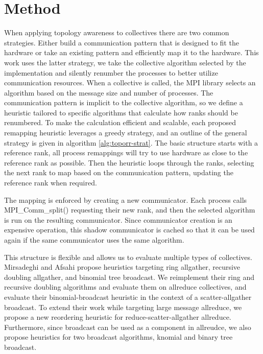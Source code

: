 \section{Method}
When applying topology awareness to collectives there are two common strategies.
Either build a communication pattern that is designed to fit the hardware or take an existing pattern and efficiently map it to the hardware.
This work uses the latter strategy, we take the collective algorithm selected by the implementation and silently renumber the processes to better utilize communication resources.
When a collective is called, the MPI library selects an algorithm based on the message size and number of processes.
The communication pattern is implicit to the collective algorithm, so we define a heuristic tailored to specific algorithms that calculate how ranks should be renumbered.
To make the calculation efficient and scalable, each proposed remapping heuristic leverages a greedy strategy, and an outline of the general strategy is given in algorithm \ref{alg:toporr-strat}.
The basic structure starts with a reference rank, all process remappings will try to use hardware as close to the reference rank as possible.
Then the heuristic loops through the ranks, selecting the next rank to map based on the communication pattern, updating the reference rank when required.

The mapping is enforced by creating a new communicator.
Each process calls MPI\_Comm\_split() requesting their new rank, and then the selected algorithm is run on the resulting communicator.
Since communicator creation is an expensive operation, this shadow communicator is cached so that it can be used again if the same communicator uses the same algorithm.

This structure is flexible and allows us to evaluate multiple types of collectives.
Mirsadeghi and Afsahi \cite{Mirsadeghi2016TopoAwareCollRR} propose heuristics targeting ring allgather, recursive doubling allgather, and binomial tree broadcast. 
We reimplement their ring and recursive doubling algorithms and evaluate them on allreduce collectives, and evaluate their binomial-broadcast heuristic in the context of a scatter-allgather broadcast.
To extend their work while targeting large message allreduce, we propose a new reordering heuristic for reduce-scatter-allgather allreduce.
Furthermore, since broadcast can be used as a component in allreudce, we also propose heuristics for two broadcast algorithms, knomial and binary tree broadcast.



